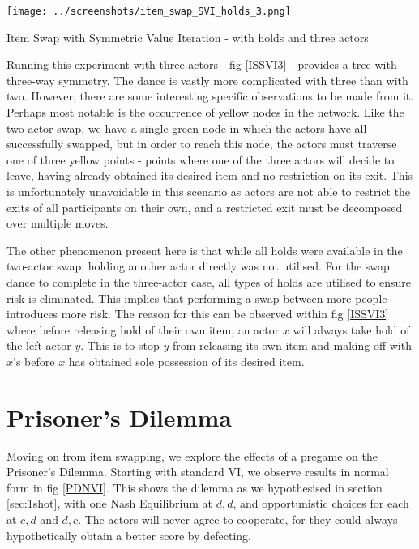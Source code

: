 \begin{fig}[H]
  \begin{minipage}[b]{1.0\linewidth}
    \centering
    \centerline{\texttt{[image: ../screenshots/item\_swap\_SVI\_holds\_3.png]}}
    \caption{Item Swap with Symmetric Value Iteration - with holds and three actors}\medskip\label{ISSVI3}
  \end{minipage}
\end{fig}

Running this experiment with three actors - fig \ref{ISSVI3} - provides a tree with three-way symmetry. The dance is vastly more complicated with three than with two. However, there are some interesting specific observations to be made from it. Perhaps most notable is the occurrence of yellow nodes in the network. Like the two-actor swap, we have a single green node in which the actors have all successfully swapped, but in order to reach this node, the actors must traverse one of three yellow points - points where one of the three actors will decide to leave, having already obtained its desired item and no restriction on its exit. This is unfortunately unavoidable in this scenario as actors are not able to restrict the exits of all participants on their own, and a restricted exit must be decomposed over multiple moves. 

The other phenomenon present here is that while all holds were available in the two-actor swap, holding another actor directly was not utilised. For the swap dance to complete in the three-actor case, all types of holds are utilised to ensure risk is eliminated. This implies that performing a swap between more people introduces more risk. The reason for this can be observed within fig \ref{ISSVI3} where before releasing hold of their own item, an actor $x$ will always take hold of the left actor $y$. This is to stop $y$ from releasing its own item and making off with $x$'s before $x$ has obtained sole possession of its desired item.

\section{Prisoner's Dilemma}\label{sec:PDres}

Moving on from item swapping, we explore the effects of a pregame on the Prisoner's Dilemma. Starting with standard VI, we observe results in normal form in fig \ref{PDNVI}. This shows the dilemma as we hypothesised in section \ref{sec:1shot}, with one Nash Equilibrium at $d,d$, and opportunistic choices for each at $c,d$ and $d,c$. The actors will never agree to cooperate, for they could always hypothetically obtain a better score by defecting.

